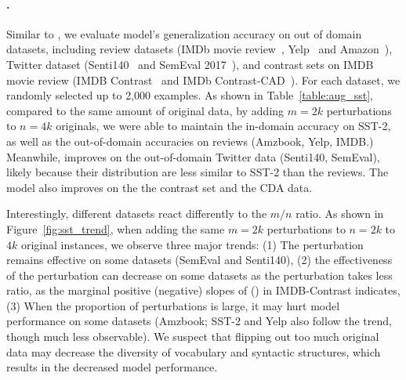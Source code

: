 \paragraph{\sst.}
 Similar to \citet{kaushik2019learning}, we evaluate \sst model's generalization accuracy on out of domain datasets, including review datasets (IMDb movie review~\cite{maas2011learning}, Yelp~\cite{asghar2016yelp} and Amazon~\cite{ni2019justifying}), Twitter dataset (Senti140~\cite{go2009twitter} and SemEval 2017~\cite{rosenthal2017semeval}), and contrast sets on IMDB movie review (IMDB Contrast~\cite{kaushik2019learning} and IMDb Contrast-CAD~\cite{gardner2020contrast}).
For each dataset, we randomly selected up to 2,000 examples.
As shown in Table~\ref{table:aug_sst}, compared to the same amount of original data, by adding $m=2k$ perturbations to $n=4k$ originals, we were able to maintain the  in-domain accuracy on SST-2, as well as the out-of-domain accuracies on reviews (Amzbook, Yelp, IMDB.)
Meanwhile, \maug improves on the out-of-domain Twitter data (Senti140, SemEval), likely because their distribution are less similar to SST-2 than the reviews.
The model also improves on the the contrast set and the CDA data.

Interestingly, different datasets react differently to the $m/n$ ratio.
As shown in Figure~\ref{fig:sst_trend}, when adding the same $m=2k$ perturbations to $n=2k$ to $4k$ original instances, we observe three major trends:
(1) The perturbation remains effective on some datasets (SemEval and Senti140), 
(2) the effectiveness of the perturbation can decrease on some datasets as the perturbation takes less ratio, as the marginal positive (negative) slopes of \mcomp (\maug) in IMDB-Contrast indicates,
(3) When the proportion of perturbations is large, it may hurt model performance on some datasets (Amzbook; SST-2 and Yelp also follow the trend, though much less observable).
We suspect that flipping out too much original data may decrease the diversity of vocabulary and syntactic structures, which results in the decreased model performance.




